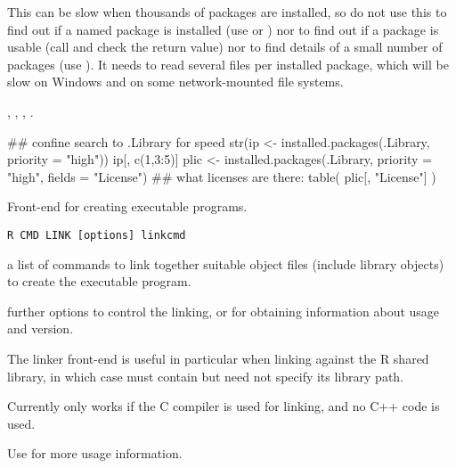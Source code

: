 %
\begin{Note}\relax
This can be slow when thousands of packages are installed, so do not
use this to find out if a named package is installed (use
 or ) nor to find
out if a package is usable (call  and check the
return value) nor to find details of a small number of packages (use
).  It needs to read several files per
installed package, which will be slow on Windows and on some
network-mounted file systems.
\end{Note}
%
\begin{SeeAlso}\relax
{},
,
, .
\end{SeeAlso}
%
\begin{Examples}
\begin{ExampleCode}
## confine search to .Library for speed
str(ip <- installed.packages(.Library, priority = "high"))
ip[, c(1,3:5)]
plic <- installed.packages(.Library, priority = "high", fields = "License")
## what licenses are there:
table( plic[, "License"] )
\end{ExampleCode}
\end{Examples}
%
\begin{Description}\relax
Front-end for creating executable programs.
\end{Description}
%
\begin{Usage}
\begin{verbatim}
R CMD LINK [options] linkcmd
\end{verbatim}
\end{Usage}
%
\begin{Arguments}
\begin{ldescription}
\item[\code{linkcmd}] a list of commands to link together suitable object
files (include library objects) to create the executable program.
\item[\code{options}] further options to control the linking, or for
obtaining information about usage and version.
\end{ldescription}
\end{Arguments}
%
\begin{Details}\relax
The linker front-end is useful in particular when linking against the
R shared library, in which case  must contain 
but need not specify its library path.

Currently only works if the C compiler is used for linking, and no C++
code is used.

Use  for more usage information.
\end{Details}
